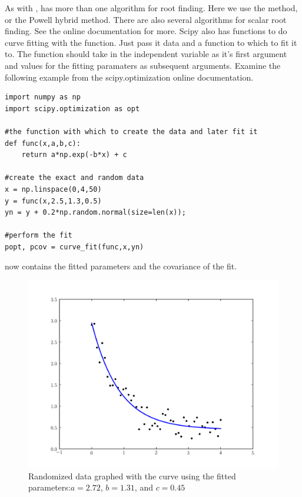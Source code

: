 As with ,  has more than one algorithm for root finding. Here we use the  method, or the Powell hybrid method. There are also several algorithms for scalar root finding. See the online documentation for more.
Scipy also has functions to do curve fitting with the  function. Just pass it data and a function to which to fit it to. The function should take in the independent variable as it's first argument and values for the fitting paramaters as subsequent arguments.
Examine the following example from the scipy.optimization online documentation.
\begin{lstlisting}
import numpy as np
import scipy.optimization as opt

#the function with which to create the data and later fit it
def func(x,a,b,c):
    return a*np.exp(-b*x) + c

#create the exact and random data
x = np.linspace(0,4,50)
y = func(x,2.5,1.3,0.5)
yn = y + 0.2*np.random.normal(size=len(x));

#perform the fit
popt, pcov = curve_fit(func,x,yn)
\end{lstlisting}
 now contains the fitted parameters and  the covariance of the fit.
\begin{figure}
\includegraphics[width=\textwidth]{curve_fit.pdf}
\caption{Randomized data graphed with the curve using the fitted parameters:$a=2.72$,  $b=1.31$, and $c=0.45$ }
\label{opt:curve_fit}
\end{figure}

